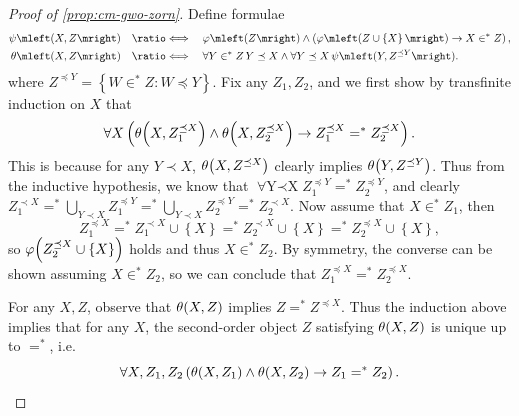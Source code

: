 \documentclass[12pt,openany]{book}
\theoremstyle{plain}
\theoremstyle{definition}
\newcommand\opA[1]{\mathop{\forall #1}}
\newcommand\defeqv{\quad \ratio\Longleftrightarrow \quad}
\begin{document}
\begin{proof}[Proof of \autoref{prop:cm-gwo-zorn}]
  Define formulae
  \begin{align*}
    \psi\mleft(X, Z\mright)   & \defeqv \varphi\mleft(Z\mright) \land \left(\varphi\mleft(Z \cup \left\{X\right\}\mright) \rightarrow X \in^* Z\right), \\
    \theta\mleft(X, Z\mright) & \defeqv \opA{Y \in^* Z} Y \preceq X \land \opA{Y \preceq X} \psi\mleft(Y, Z^{\preceq Y}\mright).
  \end{align*}
  where $Z^{\preceq Y} = \left\{W \in^* Z : W \preceq Y\right\}$. Fix any $Z_1, Z_2$, and we first show by transfinite induction on $X$ that
  \[\opA{X} \left(\theta\mleft(X, Z_1^{\preceq X}\mright) \land \theta\mleft(X, Z_2^{\preceq X}\mright) \rightarrow Z_1^{\preceq X} =^* Z_2^{\preceq X}\right).\]
  This is because for any $Y \prec X$, $\theta\mleft(X, Z^{\preceq X}\mright)$ clearly implies $\theta\mleft(Y, Z^{\preceq Y}\mright)$. Thus from the inductive hypothesis, we know that $\opA{Y \prec X} Z_1^{\preceq Y} =^* Z_2^{\preceq Y}$, and clearly $Z_1^{\prec X} =^* \bigcup_{Y \prec X} Z_1^{\preceq Y} =^* \bigcup_{Y \prec X} Z_2^{\preceq Y} =^* Z_2^{\prec X}$. Now assume that $X \in^* Z_1$, then
  \[Z_1^{\preceq X} =^* Z_1^{\prec X} \cup \left\{X\right\} =^* Z_2^{\prec X} \cup \left\{X\right\} =^* Z_2^{\preceq X} \cup \left\{X\right\},\]
  so $\varphi\mleft(Z_2^{\preceq X} \cup \left\{X\right\}\mright)$ holds and thus $X \in^* Z_2$. By symmetry, the converse can be shown assuming $X \in^* Z_2$, so we can conclude that $Z_1^{\preceq X} =^* Z_2^{\preceq X}$.

  For any $X, Z$, observe that $\theta\mleft(X, Z\mright)$ implies $Z =^* Z^{\preceq X}$. Thus the induction above implies that for any $X$, the second-order object $Z$ satisfying $\theta\mleft(X, Z\mright)$ is unique up to $=^*$, i.e.\
  \[\opA{X, Z_1, Z_2} \left(\theta\mleft(X, Z_1\mright) \land \theta\mleft(X, Z_2\mright) \rightarrow Z_1 =^* Z_2\right).\]


\end{proof}
\end{document}
